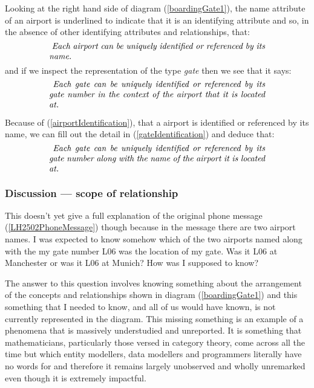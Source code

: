 \mynote
Looking at the right hand side of diagram (\ref{boardingGate1}),
the name attribute of an airport is underlined to indicate that
it is an identifying attribute and so, in the absence of other identifying attributes and relationships,
that:
\begin{equation}
\label{airportIdentification}
\text{\parbox{9cm}{\textit{
Each airport can be uniquely identified or referenced by its name.}}}
\end{equation}
and if we inspect the representation of the type \textit{gate} then we see that it says:
\begin{equation}
\label{gateIdentification}
\text{\parbox{9cm}{\textit{
Each gate can be uniquely identified or referenced by its gate number in the context of the airport that it is located at.}}}
\end{equation}

\mynote
Because of (\ref{airportIdentification}), that a airport is identified or referenced by its name,  we can fill out the detail in (\ref{gateIdentification}) and deduce that:
\begin{equation}
\label{gateNetIdentification}
\text{\parbox{9cm}{\textit{
Each gate can be uniquely identified or referenced by its gate number along with the name of the airport it is located at.}}}
\end{equation}
\subsubsection{Discussion --- scope of relationship}
This doesn't yet give a full explanation of the original phone message 
(\ref{LH2502PhoneMessage}) though because
in the message there are two airport names. 
I was expected to know somehow which of the two airports named along with the my gate number L06
was the location of my gate.  Was it L06 at Manchester or was it L06 at Munich? How was I supposed to know? 

\mynote The answer to this question involves knowing something about the arrangement
of the concepts and relationships shown in diagram (\ref{boardingGate1}) 
and this something that I needed to know, 
and all of us would have known,
is not currently represented in the diagram.  
This missing something is an example of a phenomena  
that is massively understudied and unreported. It is something that mathematicians, particularly those versed in category theory, come across all the time but which entity modellers, data modellers and programmers literally have no words for and therefore it remains largely unobserved and wholly unremarked even though it is extremely impactful.

